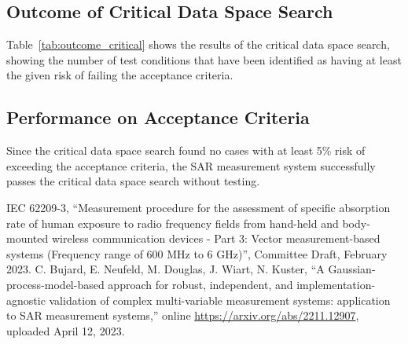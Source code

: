 \documentclass{article}
\begin{document}


\subsection{Outcome of Critical Data Space Search}

Table~\ref{tab:outcome_critical} shows the results of the critical data space search, showing the number of test conditions that have been identified as having at least the given risk of failing the acceptance criteria.



\FloatBarrier
\subsection{Performance on Acceptance Criteria} \label{subsec:acceptance_criteria}
Since the critical data space search found no cases with at least 5\% risk of exceeding the acceptance criteria, the SAR measurement system successfully passes the critical data space search without testing.

\FloatBarrier

\newpage

\begin{thebibliography}{9}
IEC 62209-3, ``Measurement procedure for the assessment of specific absorption rate of human exposure to radio frequency fields from hand-held and body-mounted wireless communication devices - Part 3: Vector measurement-based systems (Frequency range of 600 MHz to 6 GHz)'', Committee Draft, February 2023.
C. Bujard, E. Neufeld, M. Douglas, J. Wiart, N. Kuster, ``A Gaussian-process-model-based approach for robust, independent, and implementation-agnostic validation of complex multi-variable measurement systems: application to SAR measurement systems,'' online \url{https://arxiv.org/abs/2211.12907}, uploaded April 12, 2023.
\end{thebibliography}
\end{document}
